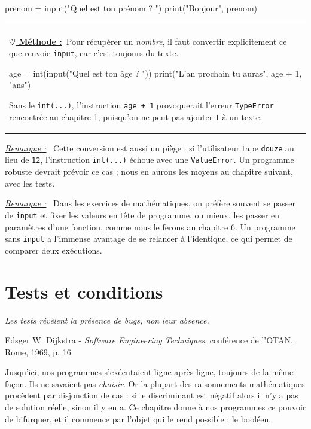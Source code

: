 \documentclass[a4paper,11pt,openany]{book}
\makeatletter
\newcommand{\code}[1]{\texttt{\textcolor{codebleu}{#1}}}
\newenvironment{cadre}%
 {\par\vspace{2mm}\noindent\begin{tabular}{|@{\hspace{4mm}}p{0.93\textwidth}@{\hspace{4mm}}|}
  \hline \\[-2mm]}%
 {\\[2mm] \hline \end{tabular}\par\vspace{3mm}}
\newcommand{\methode}{\textbf{\underline{$\heartsuit$ Méthode :}}~}
\newenvironment{remarque}%
 {\par\vspace{1mm}\begin{list}{}{\leftmargin=1cm \rightmargin=0.5cm}\item[]%
  \textit{\underline{Remarque :}}~}%
 {\end{list}\vspace{1mm}}
\newcommand{\epigraphe}[2]{%
  \begin{list}{}{\leftmargin=1cm \rightmargin=1cm}\item[]
  \small\textit{#1}
  \end{list}
  \nopagebreak
  \hfill\small #2 \par\vspace{4mm}}
\makeatother
\begin{document}
\begin{python}
prenom = input("Quel est ton prénom ? ")
print("Bonjour", prenom)
\end{python}

\begin{cadre}
\methode Pour récupérer un \emph{nombre}, il faut convertir explicitement ce que renvoie \code{input}, car c'est toujours du texte.
\begin{python}
age = int(input("Quel est ton âge ? "))
print("L'an prochain tu auras", age + 1, "ans")
\end{python}
Sans le \code{int(...)}, l'instruction \code{age + 1} provoquerait l'erreur \code{TypeError} rencontrée au chapitre 1, puisqu'on ne peut pas ajouter $1$ à un texte.
\end{cadre}

\begin{remarque}
Cette conversion est aussi un piège : si l'utilisateur tape \code{douze} au lieu de \code{12}, l'instruction \code{int(...)} échoue avec une \code{ValueError}. Un programme robuste devrait prévoir ce cas ; nous en aurons les moyens au chapitre suivant, avec les tests.
\end{remarque}

\begin{remarque}
Dans les exercices de mathématiques, on préfère souvent se passer de \code{input} et fixer les valeurs en tête de programme, ou mieux, les passer en paramètres d'une fonction, comme nous le ferons au chapitre 6. Un programme sans \code{input} a l'immense avantage de se relancer à l'identique, ce qui permet de comparer deux exécutions.
\end{remarque}
\chapter{Tests et conditions}

\epigraphe{Les tests révèlent la présence de bugs, non leur absence.}{Edsger W. Dijkstra - \emph{Software Engineering Techniques}, conférence de l'OTAN, Rome, 1969, p. 16}

Jusqu'ici, nos programmes s'exécutaient ligne après ligne, toujours de la même façon. Ils ne savaient pas \emph{choisir}. Or la plupart des raisonnements mathématiques procèdent par disjonction de cas : si le discriminant est négatif alors il n'y a pas de solution réelle, sinon il y en a. Ce chapitre donne à nos programmes ce pouvoir de bifurquer, et il commence par l'objet qui le rend possible : le booléen.
\end{document}
